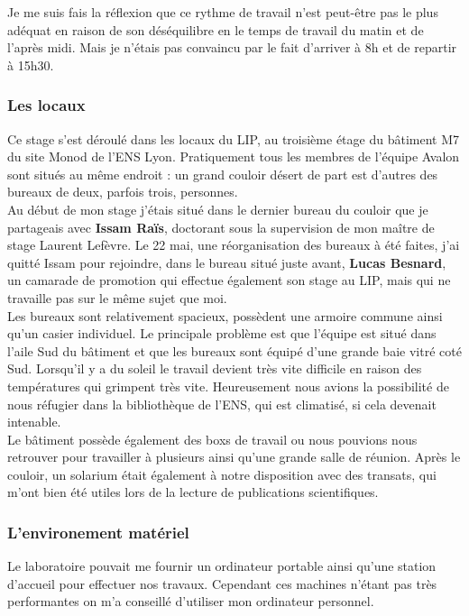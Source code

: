 Je me suis fais la réflexion que ce rythme de travail n'est peut-être pas le plus adéquat en raison de son déséquilibre en le temps de travail du matin et de l'après midi. Mais je n'étais pas convaincu par le fait d'arriver à 8h et de repartir à 15h30.
 
\subsubsection{Les locaux}
Ce stage s'est déroulé dans les locaux du LIP, au troisième étage du bâtiment M7 du site Monod de l'ENS Lyon. Pratiquement tous les membres de l'équipe Avalon sont situés au même endroit : un grand couloir désert de part est d'autres des bureaux de deux, parfois trois, personnes.\\

Au début de mon stage j'étais situé dans le dernier bureau du couloir que je partageais avec \textbf{Issam Raïs}, doctorant sous la supervision de mon maître de stage Laurent Lefèvre. Le 22 mai, une réorganisation des bureaux à été faites, j'ai quitté Issam pour rejoindre, dans le bureau situé juste avant, \textbf{Lucas Besnard}, un camarade de promotion qui effectue également son stage au LIP, mais qui ne travaille pas sur le même sujet que moi.\\

Les bureaux sont relativement spacieux, possèdent une armoire commune ainsi qu'un casier individuel. Le principale problème est que l'équipe est situé dans l'aile Sud du bâtiment et que les bureaux sont équipé d'une grande baie vitré coté Sud. Lorsqu'il y a du soleil le travail devient très vite difficile en raison des températures qui grimpent très vite. Heureusement nous avions la possibilité de nous réfugier dans la bibliothèque de l'ENS, qui est climatisé, si cela devenait intenable.\\

Le bâtiment possède également des boxs de travail ou nous pouvions nous retrouver pour travailler à plusieurs ainsi qu'une grande salle de réunion. Après le couloir, un solarium était également à notre disposition avec des transats, qui m'ont bien été utiles lors de la lecture de publications scientifiques.

\subsubsection{L'environement matériel}
Le laboratoire pouvait me fournir un ordinateur portable ainsi qu'une station d'accueil pour effectuer nos travaux. Cependant ces machines n'étant pas très performantes on m'a conseillé d'utiliser mon ordinateur personnel.\\

